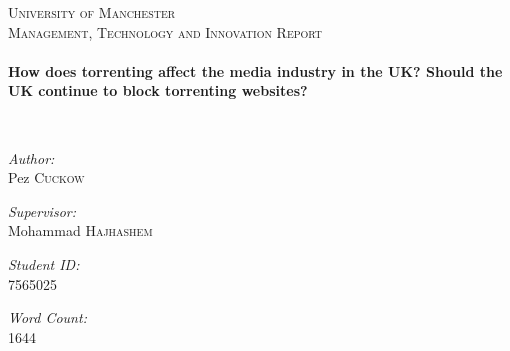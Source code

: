 \begin{titlepage}
\begin{center}

\textsc{\LARGE University of Manchester}\\[1.5cm]
\textsc{\Large Management, Technology and Innovation Report}\\[0.5cm]

\HRule \\[0.4cm]
{ \huge \bfseries How does torrenting affect the media industry in the UK? Should the UK continue to block torrenting websites? \\[0.4cm] }

\HRule \\[1.5cm]

\begin{minipage}{0.4\textwidth}
\begin{flushleft} \large
\emph{Author:}\\
Pez \textsc{Cuckow}
\end{flushleft}
\end{minipage}
\begin{minipage}{0.4\textwidth}
\begin{flushright} \large
\emph{Supervisor:} \\
Mohammad \textsc{Hajhashem}
\end{flushright}
\end{minipage}

\vspace{5mm}

\begin{minipage}{0.4\textwidth}
\begin{flushleft} \large
\emph{Student ID:}\\
7565025
\end{flushleft}
\end{minipage}
\begin{minipage}{0.4\textwidth}
\begin{flushright} \large
\emph{Word Count:} \\
1644
\end{flushright}
\end{minipage}

\vspace{5mm}


\end{center}
\end{titlepage}
